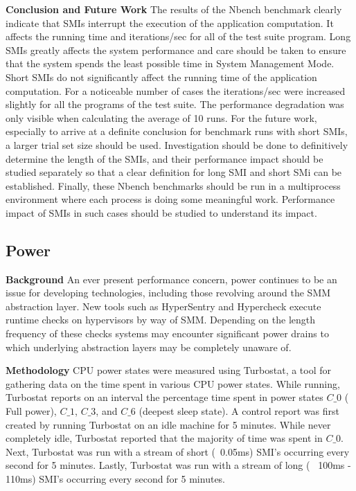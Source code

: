 \documentclass{IEEEtran}
\begin{document}
\textbf{Conclusion and Future Work}
The results of the Nbench benchmark clearly indicate that SMIs interrupt the execution of the application computation. It affects the running time and iterations/sec for all of the test suite program. Long SMIs greatly affects the system performance and care should be taken to ensure that the system spends the least possible time in System Management Mode. Short SMIs do not significantly affect the running time of the application computation. For a noticeable number of cases the iterations/sec were increased slightly for all the programs of the test suite. The performance degradation was only visible when calculating the average of 10 runs. For the future work, especially to arrive at a definite conclusion for benchmark runs with short SMIs, a larger trial set size should be used. Investigation should be done to definitively determine the length of the SMIs, and their performance impact should be studied separately so that a clear definition for long SMI and short SMi can be established. Finally, these Nbench benchmarks should be run in a multiprocess environment where each process is doing some meaningful work. Performance impact of SMIs in such cases should be studied to understand its impact.
\subsection{Power}\label{sub:power}
\textbf{Background}
An ever present performance concern, power continues to be an issue for developing technologies, including those 
revolving around the SMM abstraction layer. New tools such as HyperSentry \cite{HYPSENT} and Hypercheck \cite{HYPCH}
execute runtime checks on hypervisors by way of SMM. Depending on the length frequency of these checks systems may encounter significant power drains to which underlying abstraction layers may be completely unaware of. 

\textbf{Methodology}
CPU power states were measured using Turbostat, a tool for gathering data on the time spent 
in various CPU power states. While running, Turbostat reports on an interval the 
percentage time spent in power states $C\_0$ ( Full power), $C\_1$, $C\_3$, and $C\_6$ (deepest sleep state). 
A control report was first created by running Turbostat on an idle machine for 5 minutes. 
While never completely idle, Turbostat reported that the majority of time was spent in $C\_0$. Next, Turbostat was run with a stream of short (~0.05ms) SMI’s occurring every second for 5 minutes. Lastly, Turbostat was run with a stream of long ( ~100ms - 110ms) SMI’s occurring every second for 5 minutes.
\end{document}
